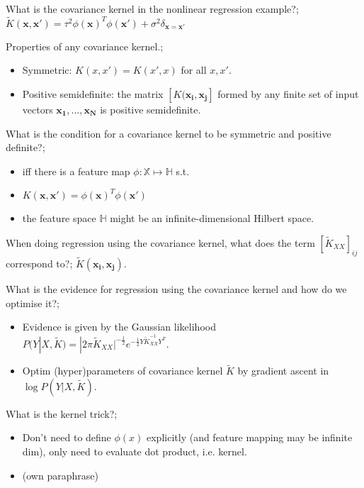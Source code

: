 \documentclass{article}
\begin{document}
What is the covariance kernel in the nonlinear regression example?; $\tilde{K}(\mathbf{x, x'})=\tau^2\phi(\mathbf{x})^T\phi(\mathbf{x}')+\sigma^2\delta_{\mathbf{x}=\mathbf{x}'}$

Properties of any covariance kernel.; \begin{itemize} \item Symmetric: $K(x, x')=K(x', x)$ for all $x, x'$.  \item Positive semidefinite: the matrix $[K(\mathbf{x_i, x_j}]$ formed by any finite set of input vectors $\mathbf{x_1, ..., x_N}$ is positive semidefinite.  \end{itemize}

What is the condition for a covariance kernel to be symmetric and positive definite?; \begin{itemize} \item iff there is a feature map $\phi:\mathbb{X}\mapsto\mathbb{H}$ s.t.  \item $K(\mathbf{x, x'})=\phi(\mathbf{x})^T\phi(\mathbf{x'})$ \item the feature space $\mathbb{H}$ might be an infinite-dimensional Hilbert space.  \end{itemize}

When doing regression using the covariance kernel, what does the term $[\tilde{K}_{XX}]_{ij}$ correspond to?; $\tilde{K}(\mathbf{x_i, x_j})$.

What is the evidence for regression using the covariance kernel and how do we optimise it?; \begin{itemize} \item Evidence is given by the Gaussian likelihood $P(Y|X, \tilde{K})=|2\pi\tilde{K}_{XX}|^{-\frac{1}{2}}e^{-\frac{1}{2}Y\tilde{K}_{XX}^{-1}Y^T}$.  \item Optim (hyper)parameters of covariance kernel $\tilde{K}$ by gradient ascent in $\log P(Y|X, \tilde{K})$.  \end{itemize} 

What is the kernel trick?; \begin{itemize} \item Don't need to define $\phi(x)$ explicitly (and feature mapping may be infinite dim), only need to evaluate dot product, i.e. kernel.  \item (own paraphrase) \end{itemize}
\end{document}

